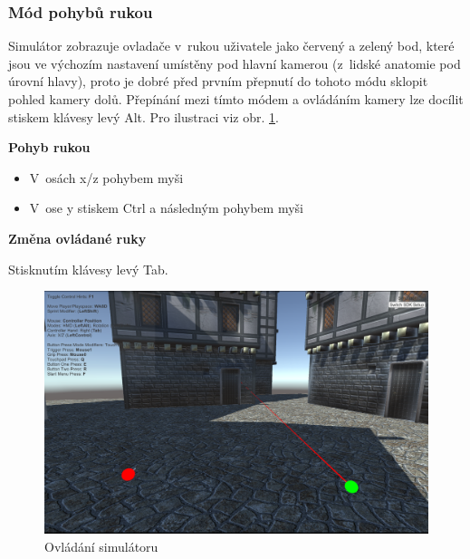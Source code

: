 \documentclass[thesis=B,czech]{FITthesis}[2012/06/26]
\begin{document}
\subsubsection{Mód pohybů rukou}
Simulátor zobrazuje ovladače v~rukou uživatele jako červený a zelený bod, které jsou ve výchozím nastavení umístěny pod hlavní kamerou (z~lidské anatomie pod úrovní hlavy), proto je dobré před prvním přepnutí do tohoto módu sklopit pohled kamery dolů. Přepínání mezi tímto módem a ovládáním kamery lze docílit stiskem klávesy levý Alt. Pro ilustraci viz obr. \ref{fig:simulator}.

\begin{description}

	\item \textbf{Pohyb rukou}
	
	\begin{itemize}
		\item V~osách x/z pohybem myši
		\item V~ose y stiskem Ctrl a následným pohybem myši
	\end{itemize}

	\item \textbf{Změna ovládané ruky}
	
	Stisknutím klávesy levý Tab.	

\end{description}

\begin{figure}
  		\includegraphics[width=\textwidth,height=\textheight,keepaspectratio]{screen2.png}
  		\caption{Ovládání simulátoru}
  		\label{fig:simulator}
	\end{figure}
\end{document}
